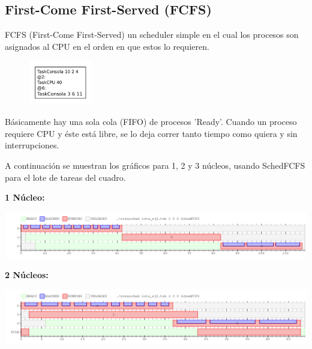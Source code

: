 \subsection{First-Come First-Served (FCFS)}

FCFS (First-Come First-Served) un scheduler simple en el cual los procesos son asignados al CPU en el orden en que estos lo requieren.

\begin{figure}
  \vspace{-30pt}
  \begin{center}
    \includegraphics[width=0.25\textwidth]{./FCFS/FCFS_loteTareas.png}
  \end{center}
   \vspace{-30pt}
\end{figure}

Básicamente hay una sola cola (FIFO) de procesos 'Ready'. 
Cuando un proceso requiere CPU y éste está libre, se lo deja correr tanto tiempo como quiera y sin interrupciones.

A continuación se muestran los gráficos para 1, 2 y 3 núcleos, usando SchedFCFS para el lote de tareas del cuadro.

\vspace{10pt}
\textbf{1 Núcleo:}
\vspace{-20pt}
\begin{center}
 \includegraphics[scale=0.45]{./FCFS/FCFS_1core.png}
\end{center}

\vspace{10pt}

\textbf{2 Núcleos:}
\vspace{-20pt}
\begin{center}
 \includegraphics[scale=0.45]{./FCFS/FCFS_2core.png}
\end{center}

